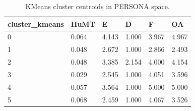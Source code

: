 \begin{table}[t]
\centering
\caption{KMeans cluster centroids in PERSONA space.}
\label{tab:clusters}
\begin{tabular}{llllll}
\toprule
cluster\_kmeans & HuMT & E & D & F & OA \\
\midrule
0 & 0.064 & 4.143 & 1.000 & 3.967 & 4.967 \\
1 & 0.048 & 2.672 & 1.000 & 2.866 & 2.493 \\
2 & 0.048 & 3.385 & 2.154 & 4.000 & 4.154 \\
3 & 0.029 & 2.545 & 1.000 & 4.051 & 3.596 \\
4 & 0.057 & 3.564 & 1.000 & 5.000 & 5.000 \\
5 & 0.068 & 2.459 & 1.000 & 4.067 & 3.526 \\
\bottomrule
\end{tabular}
\end{table}
